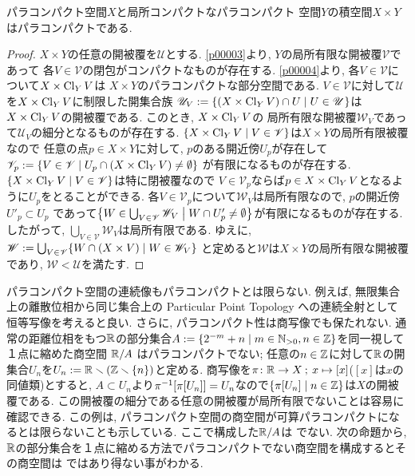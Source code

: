 \documentclass[uplatex, dvipdfmx, a4paper, 12pt, class=jsbook, crop=false]{standalone}
\begin{document}
\begin{proposition}
	パラコンパクト空間$ X $と局所コンパクトなパラコンパクト  空間$ Y $の積空間$ X \times Y $はパラコンパクトである.
\end{proposition}

\begin{proof}
	$ X \times Y $の任意の開被覆を$ \mathscr{U} $とする.
	\cref{p00003}より, $ Y $の局所有限な開被覆$ \mathscr{V} $であって
	各$ V \in \mathscr{V} $の閉包がコンパクトなものが存在する.
	\cref{p00004}より, 各$ V \in \mathscr{V} $について$ X \times \mathop{\mathrm{Cl}}\nolimits_Y V $は
	$ X \times Y $のパラコンパクトな部分空間である.
	$ V \in \mathscr{V} $に対して$ \mathscr{U} $を$ X \times \mathop{\mathrm{Cl}}\nolimits_Y V $に制限した開集合族
	$ \mathscr{U}_V \defeq \setcomp{(X \times \topcl_Y V) \cap U}{U \in \mathscr{U}} $は
	$ X \times \mathop{\mathrm{Cl}}\nolimits_Y V $の開被覆である. このとき, $ X \times \mathop{\mathrm{Cl}}\nolimits_Y V $の
	局所有限な開被覆$ \mathscr{W}_V $であって$ \mathscr{U}_V $の細分となるものが存在する.
	$ \setcomp{X \times \topcl_Y V}{V \in \mathscr{V}} $は$ X \times Y $の局所有限被覆なので
	任意の点$ p \in X \times Y $に対して, $ p $のある開近傍$ U_p $が存在して
	$ \mathscr{V}_p \defeq \setcomp{V \in \mathscr{V}}{U_p \cap (X \times \topcl_Y V) \neq \emptyset} $
	が有限になるものが存在する.
	$ \setcomp{X \times \topcl_Y V}{V \in \mathscr{V}} $は特に閉被覆なので
	$ V \in \mathscr{V}_p $ならば$ p \in X \times \mathop{\mathrm{Cl}}\nolimits_Y V $となるように$ U_p $をとることができる.
	各$ V \in \mathscr{V}_p $について$ \mathscr{W}_V $は局所有限なので, $ p $の開近傍$ U'_p \subset U_p $
	であって$ \setcomp{W \in \bigcup_{V \in \mathscr{V}} \mathscr{W}_V}
	{W \cap U'_p \neq \emptyset} $が有限になるものが存在する.
	したがって, $ \bigcup_{V \in \mathscr{V}} \mathscr{W}_V $は局所有限である.
	ゆえに, $ \mathscr{W} \defeq \bigcup_{V \in \mathscr{V}} \setcomp{W \cap (X \times V)}{W \in \mathscr{W}_V} $
	と定めると$ \mathscr{W} $は$ X \times Y $の局所有限な開被覆であり, $ \mathscr{W} < \mathscr{U} $を満たす.
\end{proof}

パラコンパクト空間の連続像もパラコンパクトとは限らない.
例えば, 無限集合上の離散位相から同じ集合上の Particular Point Topology への連続全射として恒等写像を考えると良い.
さらに, パラコンパクト性は商写像でも保たれない.
通常の距離位相をもつ$ \mathbb{R} $の部分集合$ A \defeq \setcomp{2^{-m}+n}{m \in \N_{>0}, n \in \Z} $を同一視して１点に縮めた商空間
$ \mathbb{R} / A $ はパラコンパクトでない; 任意の$ n \in \mathbb{Z} $に対して$ \mathbb{R} $の開集合$ U_n $を$ U_n \mathrel{:=} \mathbb{R} \smallsetminus (\mathbb{Z} \smallsetminus \{n\}) $と定める.
商写像を$ \pi\colon\mathbb{R}\to X\mathpunct{\: ; \:} x\mapsto[x] $($ [x] $は$ x $の同値類)とすると,
$ A \subset U_n $より$ \mapinvset{\pi}{\mapset{\pi}{U_n}}= U_n $なので$ \setcomp{\mapset{\pi}{U_n}}{n \in \Z} $は$ X $の開被覆である.
この開被覆の細分である任意の開被覆が局所有限でないことは容易に確認できる.
この例は, パラコンパクト空間の商空間が可算パラコンパクトになるとは限らないことも示している.
ここで構成した$ \mathbb{R} / A $は  でない.
次の命題から, $ \mathbb{R} $の部分集合を１点に縮める方法でパラコンパクトでない商空間を構成するとその商空間は  ではあり得ない事がわかる.
\end{document}
